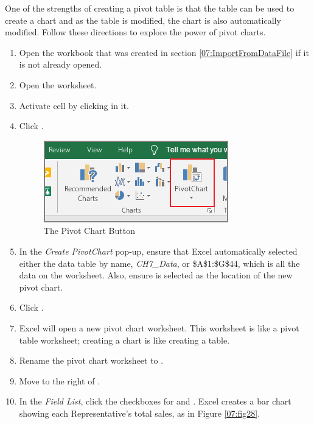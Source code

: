 One of the strengths of creating a pivot table is that the table can be used to create a chart and as the table is modified, the chart is also automatically modified. Follow these directions to explore the power of pivot charts.

\begin{enumbox}
	\begin{enumerate}
		\item Open the  workbook that was created in section \ref{07:ImportFromDataFile} if it is not already opened.
		\item Open the  worksheet.
		\item Activate cell  by clicking in it.  
		\item Click .

		\begin{figure}[H]
			\centering
			\includegraphics[width=\maxwidth{.95\linewidth}]{gfx/ch07_fig27}
			\caption{The Pivot Chart Button}
			\label{07:fig27}
		\end{figure}

		\item In the \textit{Create PivotChart} pop-up, ensure that Excel automatically selected either the data table by name, \textit{CH7\_Data}, or \$A\$1:\$G\$44, which is all the data on the worksheet. Also, ensure  is selected as the location of the new pivot chart.
		\item Click .
		\item Excel will open a new pivot chart worksheet. This worksheet is like a pivot table worksheet; creating a chart is like creating a table.
		\item Rename the pivot chart worksheet to . 
		\item Move  to the right of .
		\item In the \textit{Field List}, click the checkboxes for  and . Excel creates a bar chart showing each Representative's total sales, as in Figure \ref{07:fig28}.
	

\end{enumerate}
\end{enumbox}
